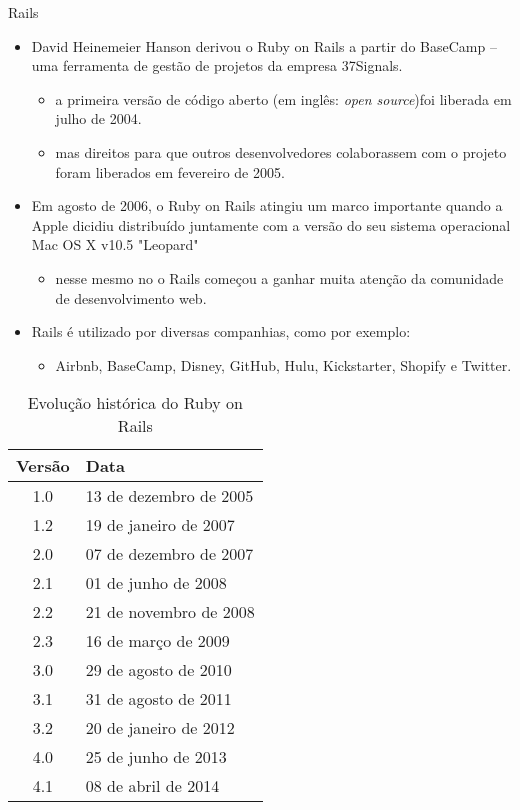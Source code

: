\begin{frame}{Rails}
  \begin{itemize}
    \item David Heinemeier Hanson \alert{derivou} o Ruby on Rails a partir do BaseCamp --
      uma ferramenta de gestão de projetos da empresa 37Signals.
    \begin{itemize}
	\item a primeira versão de código aberto (em inglês: \textit{open source})foi liberada em 
	  julho de 2004.
	\item mas direitos para que outros desenvolvedores \alert{colaborassem} com o projeto foram liberados
	  em fevereiro de 2005.
    \end{itemize}
    \item Em agosto de 2006, o Ruby on Rails atingiu um \alert{marco importante} quando a Apple dicidiu
      distribuído juntamente com a versão do seu sistema operacional Mac OS X v10.5 "Leopard"
    \begin{itemize}
     \item nesse mesmo no o Rails começou a ganhar muita atenção da comunidade de desenvolvimento web.
    \end{itemize}
    \item Rails é utilizado por diversas companhias, como por exemplo:
    \begin{itemize}
     \item Airbnb, BaseCamp, Disney, GitHub, Hulu, Kickstarter, Shopify e Twitter.
    \end{itemize}

  \end{itemize} 
  \begin{table}\centering\scriptsize
      \begin{tabular}{@{}cl@{}}\toprule
	\textbf{Versão} & \textbf{Data}	\\ \midrule
	1.0 & 13 de dezembro de 2005	\\
	1.2 & 19 de janeiro de 2007	\\
	2.0 & 07 de dezembro de 2007	\\
	2.1 & 01 de junho de 2008	\\
	2.2 & 21 de novembro de 2008	\\ 
	2.3 & 16 de março de 2009	\\
	3.0 & 29 de agosto de 2010	\\
	3.1 & 31 de agosto de 2011	\\
	3.2 & 20 de janeiro de 2012	\\
	4.0 & 25 de junho de 2013	\\
	4.1 & 08 de abril de 2014	\\ \bottomrule
      \end{tabular}
      \caption{Evolução histórica do Ruby on Rails}
    \end{table}  
\end{frame}
